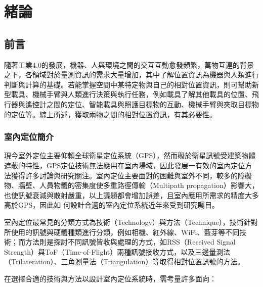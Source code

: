 \chapter{緒論}


\section{前言} %

隨著工業4.0的發展，機器、人與環境之間的交互互動愈發頻繁，萬物互連的背景之下，各領域對於量測資訊的需求大量增加，其中了解位置資訊為機器與人類進行判斷與計算的基礎。若能掌握空間中某特定物與自己的相對位置資訊，則可幫助新型載具、機械手臂與人類進行決策與執行任務，例如載具了解其他載具的位置、飛行器與遙控計之間的定位、智能載具與照護目標物的互動、機械手臂與夾取目標物的定位等。綜上所述，獲取兩物之間的相對位置資訊，有其必要性。





\subsection{室內定位簡介}
現今室外定位主要仰賴全球衛星定位系統（GPS），然而礙於衛星訊號受建築物體遮蔽的特性，GPS定位技術無法應用在室內場域，因此發展一有效的室內定位方法獲得許多討論與研究關注。室內定位主要面對的困難與室外不同，較多的障礙物、牆壁、人員物體的密集度使多重路徑傳輸（Multipath propagation）影響大，也使訊號衰減與散射嚴重，以上議題都會增加誤差，且室內應用所需求的精度大多高於GPS，因此如
何設計合適的室內定位系統近年來受到研究矚目\cite{survey_indoor2014}。

室內定位最常見的分類方式為技術（Technology）與方法（Technique）\cite{survey_indoor2018}，技術針對所使用的訊號與硬體種類進行分類，例如相機、紅外線、WiFi、藍芽等不同技術；而方法則是探討不同訊號皆收與處理的方式，如RSS（Received Signal Strength）與ToF（Time-of-Flight）兩種訊號接收方式，以及三邊量測法（Trilateration）、三角測量法（Triangulation）等取得相對位置訊號的方法。

\newpage

在選擇合適的技術與方法以設計室內定位系統時，需考量許多面向：

